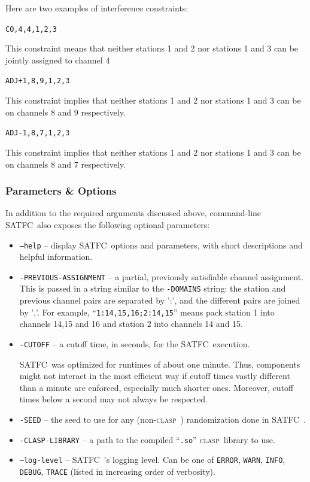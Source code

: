 \documentclass[
10pt, %
letterpaper, %
oneside, %
headinclude,footinclude, %
BCOR5mm, %
needspace, %
]{scrartcl}
\newcommand{\SATFC}{\textsc{SATFC}~}
\newcommand{\clasp}{\textsc{clasp}~}
\begin{document}
Here are two examples of interference constraints:
\begin{center}
\texttt{CO,4,4,1,2,3}
\end{center}
This constraint means that neither stations 1 and 2 nor stations 1 and 3 can be jointly assigned to channel 4
\begin{center}
\texttt{ADJ+1,8,9,1,2,3}
\end{center}
This constraint implies that neither stations 1 and 2 nor stations 1 and 3 can be on channels 8 and 9 respectively.
\begin{center}
\texttt{ADJ-1,8,7,1,2,3}
\end{center}
This constraint implies that neither stations 1 and 2 nor stations 1 and 3 can be on channels 8 and 7 respectively.

\subsubsection{Parameters \& Options}
In addition to the required arguments discussed above, command-line \SATFC also exposes the following optional parameters:
\begin{itemize}
\item \texttt{---help} -- display \SATFC options and parameters, with short descriptions and helpful information.
\item \texttt{-PREVIOUS-ASSIGNMENT} -- a partial, previously satisfiable channel assignment. This is passed in a string similar to the \texttt{-DOMAINS} string: the station and previous channel pairs are separated by ':', and the different pairs are joined by ','. For example, ``\texttt{1:14,15,16;2:14,15}'' means pack station 1 into channels 14,15 and 16 and station 2 into channels 14 and 15.
\item \texttt{-CUTOFF} -- a cutoff time, in seconds, for the \SATFC execution. 
\begin{fwarning}
\SATFC was optimized for runtimes of about one minute. Thus, components might not interact in the most efficient way if cutoff times vastly different than a minute are enforced, especially much shorter ones. Moreover, cutoff times below a second may not always be respected.
\end{fwarning}
\item \texttt{-SEED} -- the seed to use for any (non-\clasp) randomization done in \SATFC.
\item \texttt{-CLASP-LIBRARY} -- a path to the compiled ``\texttt{.so}'' \clasp library to use.
\item \texttt{---log-level} -- \SATFC's logging level. Can be one of \texttt{ERROR}, \texttt{WARN}, \texttt{INFO}, \texttt{DEBUG}, \texttt{TRACE} (listed in increasing order of verbosity).
\end{itemize}
\end{document}
